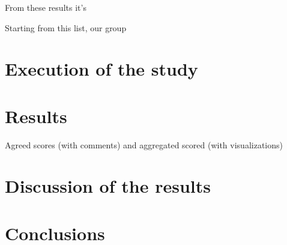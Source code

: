 From these results it's

Starting from this list, our group

\section{Execution of the study}

\section{Results}
Agreed scores (with comments) and aggregated scored (with visualizations)

\section{Discussion of the results}

\section{Conclusions}
